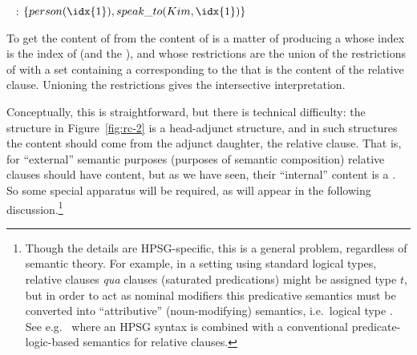 \documentclass[output=paper,nonflat,draftmode]{./langsci/langscibook}
\begin{document}
\begin{exe}
  \ex\label{x:rc-37}
 \end{exe}
\begin{exe}
     \ex\label{x:rc-38}~ : \ensuremath{\{person(\idx{1}),
        speak\_to(Kim,\idx{1})\}}
\end{exe}
To get the content of  from the content of  is a
matter of producing a  whose index is the index of  (and
the ), and whose restrictions are the union of the restrictions of
 with a set containing a  corresponding to the
 that is the content of the relative clause. Unioning the restrictions gives
the intersective interpretation.

Conceptually, this is straightforward, but there is technical difficulty: the structure in
Figure~\ref{fig:rc-2} is a head-adjunct structure, and in such structures the content should
come from the adjunct daughter, the relative clause. That is, for ``external'' semantic
purposes (purposes of semantic composition) relative clauses should have
 content, but as we have seen, their ``internal'' content is a
. So some special apparatus will be required, as will appear in the following
discussion.\footnote{Though the details are HPSG-specific, this is a general problem,
  regardless of semantic theory. For example, in a setting using standard logical types,
  relative clauses \emph{qua} clauses (saturated predications) might be assigned type $t$,
  but in order to act as nominal modifiers this predicative semantics must be converted
  into ``attributive'' (noun-modifying) semantics, i.e.\  logical type
  . See e.g.\ \cite[521--524]{Sag:10b} where an HPSG syntax is combined with a conventional
  predicate-logic-based semantics for relative clauses. }
\end{document}
